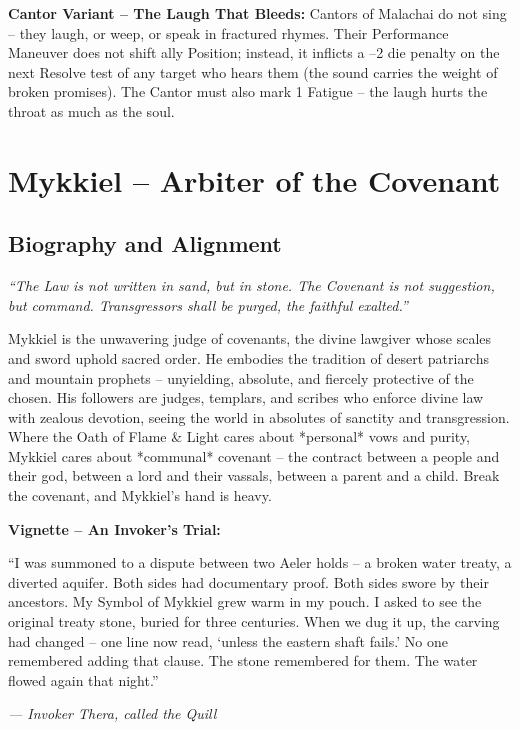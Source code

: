 \documentclass[10pt,a5paper]{book}
\begin{document}
\noindent \textbf{Cantor Variant – The Laugh That Bleeds:}
Cantors of Malachai do not sing – they laugh, or weep, or speak in fractured rhymes. Their Performance Maneuver does not shift ally Position; instead, it inflicts a –2 die penalty on the next Resolve test of any target who hears them (the sound carries the weight of broken promises). The Cantor must also mark 1 Fatigue – the laugh hurts the throat as much as the soul.

\clearpage

\section{Mykkiel – Arbiter of the Covenant}
\label{patron:mykkiel}

\subsection*{Biography and Alignment}

\textit{“The Law is not written in sand, but in stone. The Covenant is not suggestion, but command. Transgressors shall be purged, the faithful exalted.”}

Mykkiel is the unwavering judge of covenants, the divine lawgiver whose scales and sword uphold sacred order. He embodies the tradition of desert patriarchs and mountain prophets – unyielding, absolute, and fiercely protective of the chosen. His followers are judges, templars, and scribes who enforce divine law with zealous devotion, seeing the world in absolutes of sanctity and transgression. Where the Oath of Flame & Light cares about *personal* vows and purity, Mykkiel cares about *communal* covenant – the contract between a people and their god, between a lord and their vassals, between a parent and a child. Break the covenant, and Mykkiel’s hand is heavy.

\textbf{Vignette – An Invoker’s Trial:}
\epigraph{“I was summoned to a dispute between two Aeler holds – a broken water treaty, a diverted aquifer. Both sides had documentary proof. Both sides swore by their ancestors. My Symbol of Mykkiel grew warm in my pouch. I asked to see the original treaty stone, buried for three centuries. When we dug it up, the carving had changed – one line now read, ‘unless the eastern shaft fails.’ No one remembered adding that clause. The stone remembered for them. The water flowed again that night.”}{\textit{— Invoker Thera, called the Quill}}
\end{document}
